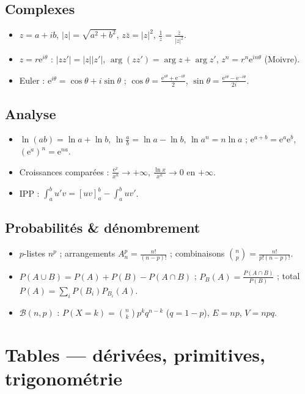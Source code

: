 \subsection{Complexes}
\begin{itemize}\setlength\itemsep{2pt}
\item $z=a+ib$, $|z|=\sqrt{a^2+b^2}$, $z\bar z=|z|^2$, $\frac1z=\frac{\bar z}{|z|^2}$.
\item $z=r\mathrm{e}^{i\theta}$ : $|zz'|=|z||z'|$, $\arg(zz')=\arg z+\arg z'$, $z^n=r^n\mathrm{e}^{in\theta}$ (Moivre).
\item Euler : $\mathrm{e}^{i\theta}=\cos\theta+i\sin\theta$ ; $\cos\theta=\frac{\mathrm{e}^{i\theta}+\mathrm{e}^{-i\theta}}2$, $\sin\theta=\frac{\mathrm{e}^{i\theta}-\mathrm{e}^{-i\theta}}{2i}$.
\end{itemize}

\subsection{Analyse}
\begin{itemize}\setlength\itemsep{2pt}
\item $\ln(ab)=\ln a+\ln b$, $\ln\frac ab=\ln a-\ln b$, $\ln a^n=n\ln a$ ; $\mathrm{e}^{a+b}=\mathrm{e}^a\mathrm{e}^b$, $(\mathrm{e}^a)^n=\mathrm{e}^{na}$.
\item Croissances comparées : $\frac{\mathrm{e}^x}{x^n}\to+\infty$, $\frac{\ln x}{x^n}\to0$ en $+\infty$.
\item IPP : $\int_a^b u'v=[uv]_a^b-\int_a^b uv'$.
\end{itemize}

\subsection{Probabilités \& dénombrement}
\begin{itemize}\setlength\itemsep{2pt}
\item $p$-listes $n^p$ ; arrangements $A_n^p=\frac{n!}{(n-p)!}$ ; combinaisons $\binom np=\frac{n!}{p!(n-p)!}$.
\item $P(A\cup B)=P(A)+P(B)-P(A\cap B)$ ; $P_B(A)=\frac{P(A\cap B)}{P(B)}$ ; total $P(A)=\sum_iP(B_i)P_{B_i}(A)$.
\item $\mathcal B(n,p)$ : $P(X{=}k)=\binom nk p^k q^{n-k}$ ($q=1-p$), $E=np$, $V=npq$.
\end{itemize}

\section{Tables — dérivées, primitives, trigonométrie}

